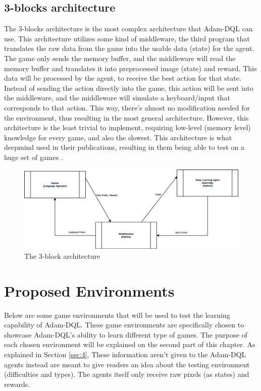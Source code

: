     \subsection{3-blocks architecture}
        The 3-blocks architecture is the most complex architecture that Adam-DQL can use. This architecture utilizes some kind of middleware, the third program that translates the raw data from the game into the usable data (state) for the agent. The game only sends the memory buffer, and the middleware will read the memory buffer and translates it into preprocessed image (state) and reward. This data will be processed by the agent, to receive the best action for that state. Instead of sending the action directly into the game, this action will be sent into the middleware, and the middleware will simulate a keyboard/input that corresponds to that action. This way, there's almost no modification needed for the environment, thus resulting in the most general architecture. However, this architecture is the least trivial to implement, requiring low-level (memory level) knowledge for every game, and also the slowest. This architecture is what deepmind used in their publications, resulting in them being able to test on a huge set of games \cite{mnih2015humanlevel}.
           \begin{figure}[H]
            \centering
            \includegraphics[scale=0.33]{images/framework3block.png}
            \caption{The 3-block architecture}
            \label{fig:3block}
        \end{figure}
        
    
 
        
  \section{Proposed Environments} \label{environment}
	
	Below are some game environments that will be used to test the learning capability of Adam-DQL. These game environments are specifically chosen to showcase Adam-DQL's ability to learn different type of games. The purpose of each chosen environment will be explained on the second part of this chapter. As explained in Section \ref{sec:4}, These information aren't given to the Adam-DQL agents instead are meant to give readers an idea about the testing environment (difficulties and types). The agents itself only receive raw pixels (as states) and rewards. 
